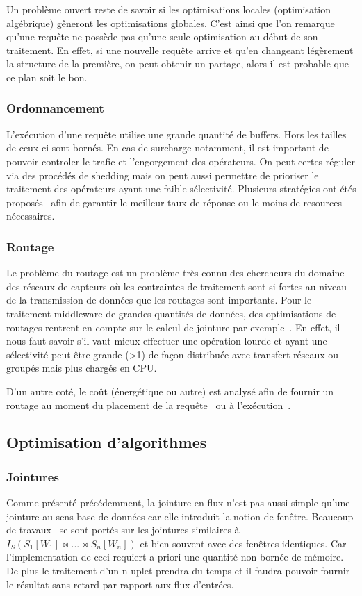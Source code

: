 Un problème ouvert reste de savoir si les optimisations locales (optimisation algébrique) gêneront les optimisations globales. C'est ainsi que l'on remarque qu'une requête ne possède pas qu'une seule optimisation au début de son traitement. En effet, si une nouvelle requête arrive et qu'en changeant légèrement la structure de la première, on peut obtenir un partage, alors il est probable que ce plan soit le bon.

\subsubsection{Ordonnancement}
L'exécution d'une requête utilise une grande quantité de buffers. Hors les tailles de ceux-ci sont bornés. En cas de surcharge notamment, il est important de pouvoir controler le trafic et l'engorgement des opérateurs. On peut certes réguler via des procédés de shedding mais on peut aussi permettre de prioriser le traitement des opérateurs ayant une faible sélectivité. Plusieurs stratégies ont étés proposés~\cite{Babcock:chain, Jiang:scheduling} afin de garantir le meilleur taux de réponse ou le moins de resources nécessaires.

\subsubsection{Routage}
Le problème du routage est un problème très connu des chercheurs du domaine des réseaux de capteurs où les contraintes de traitement sont si fortes au niveau de la transmission de données que les routages sont importants. Pour le traitement middleware de grandes quantités de données, des optimisations de routages rentrent en compte sur le calcul de jointure par exemple~\cite{Zhou:pmjoin}. En effet, il nous faut savoir s'il vaut mieux effectuer une opération lourde et ayant une sélectivité peut-être grande (>1) de façon distribuée avec transfert réseaux ou groupés mais plus chargés en CPU. 

D'un autre coté, le coût (énergétique ou autre) est analysé afin de fournir un routage au moment du placement de la requête~\cite{Galpin:snee} ou à l'exécution~\cite{Madden:tinydb}.


\subsection{Optimisation d'algorithmes}

\subsubsection{Jointures}
Comme présenté précédemment, la jointure en flux n'est pas aussi simple qu'une jointure au sens base de données car elle introduit la notion de fenêtre. Beaucoup de travaux~\cite{Han:join, Srivastava:join, Law:join} se sont portés sur les jointures similaires à $I_S (S_1[W_1] \Join ... \Join S_n[W_n])$ et bien souvent avec des fenêtres identiques. Car l'implementation de ceci requiert a priori une quantité non bornée de mémoire. De plus le traitement d'un n-uplet prendra du temps et il faudra pouvoir fournir le résultat sans retard par rapport aux flux d'entrées. 

